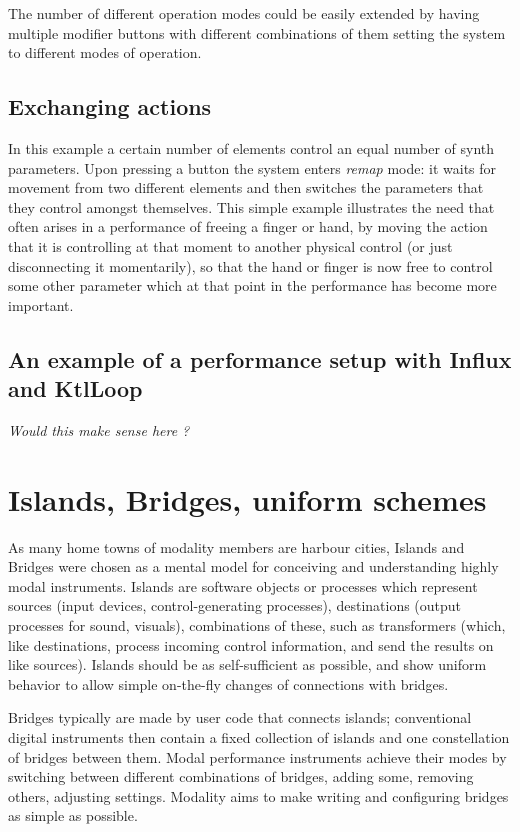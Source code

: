 \documentclass{article}
\begin{document}
The number of different operation modes could be easily extended by having multiple modifier buttons with different combinations of them setting the system to different modes of operation.
       
\subsection{Exchanging actions}
\label{sub:exchanging_actions}

In this example a certain number of elements control an equal number of synth parameters. Upon pressing a button the system enters \emph{remap} mode: it waits for movement from two different elements and then switches the parameters that they control amongst themselves. This simple example illustrates the need that often arises in a performance of freeing a finger or hand, by moving the action that it is controlling at that moment to another physical control (or just disconnecting it momentarily), so that the hand or finger is now free to control some other parameter which at that point in the performance has become more important. 

\subsection{An example of a performance setup with Influx and KtlLoop}

\emph{Would this make sense here ?}


\section{Islands, Bridges, uniform schemes}
\label{sec:islands_and_bridges_uniform_protocols}
As many home towns of modality members are harbour cities, Islands and Bridges were chosen as a mental model for conceiving and understanding highly modal instruments.
Islands are software objects or processes which represent sources (input devices, control-generating processes), destinations (output processes for sound, visuals), combinations of these, such as transformers (which, like destinations, process incoming control information, and send the results on like sources). 
Islands should be as self-sufficient as possible, and show uniform behavior to allow simple on-the-fly changes of connections with bridges. 

Bridges typically are made by user code that connects islands; conventional digital instruments then contain a fixed collection of islands and one constellation of bridges between them. Modal performance instruments achieve their modes by switching between different combinations of bridges, adding some, removing others, adjusting settings. 
Modality aims to make writing and configuring bridges as simple as possible. 
\end{document}
